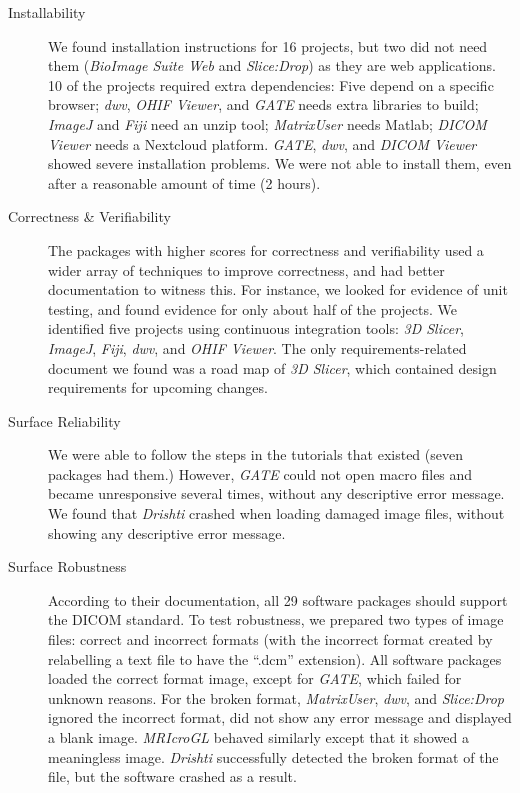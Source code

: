 \documentclass[final, 12pt, 3p, times]{elsarticle}
\begin{document}
\begin{description}

\item [Installability] We found installation instructions for 16 projects, but
two did not need them (\textit{BioImage Suite Web} and \textit{Slice:Drop}) as
they are web applications. 10 of the projects required extra dependencies: Five
depend on a specific browser; \textit{dwv}, \textit{OHIF Viewer}, and
\textit{GATE} needs extra libraries to build; \textit{ImageJ} and \textit{Fiji}
need an unzip tool; \textit{MatrixUser} needs Matlab; \textit{DICOM Viewer}
needs a Nextcloud platform. \textit{GATE}, \textit{dwv}, and \textit{DICOM
Viewer} showed severe installation problems. We were not able to install them,
even after a reasonable amount of time (2 hours).

\item [Correctness \& Verifiability] The packages with higher scores for
correctness and verifiability used a wider array of techniques to improve
correctness, and had better documentation to witness this.  For instance, we
looked for evidence of unit testing, and found evidence for only about half of
the projects. We identified five projects using continuous integration tools:
\textit{3D Slicer}, \textit{ImageJ}, \textit{Fiji}, \textit{dwv}, and
\textit{OHIF Viewer}. The only requirements-related document we found was a road
map of \textit{3D Slicer}, which contained design requirements for upcoming
changes.

\item [Surface Reliability] We were able to follow the steps in the tutorials
that existed (seven packages had them.) However, \textit{GATE} could not open
macro files and became unresponsive several times, without any descriptive error
message. We found that \textit{Drishti} crashed when loading damaged image
files, without showing any descriptive error message.

\item [Surface Robustness] According to their documentation, all 29 software
packages should support the DICOM standard. To test robustness, we prepared two
types of image files: correct and incorrect formats (with the incorrect format
created by relabelling a text file to have the ``.dcm'' extension).  All
software packages loaded the correct format image, except for \textit{GATE},
which failed for unknown reasons.  For the broken format, \textit{MatrixUser},
\textit{dwv}, and \textit{Slice:Drop} ignored the incorrect format, did not show
any error message and displayed a blank image.  \textit{MRIcroGL} behaved
similarly except that it showed a meaningless image.  \textit{Drishti}
successfully detected the broken format of the file, but the software crashed as
a result.


\end{description}
\end{document}
